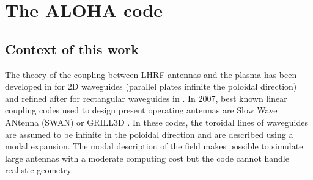 \clearpage
\section{The ALOHA code}\label{sec:ALOHA}
\subsection{Context of this work}
The theory of the coupling between LHRF antennas and the plasma has been developed in  for 2D waveguides (parallel plates infinite the poloidal direction) and refined after for rectangular waveguides in . In 2007, best known linear coupling codes used to design present operating antennas are Slow Wave ANtenna (SWAN)  or GRILL3D . In these codes, the toroidal lines of waveguides are assumed to be infinite in the poloidal direction and are described using a modal expansion. The modal description of the field makes possible to simulate large antennas with a moderate computing cost but the code cannot handle realistic geometry.

